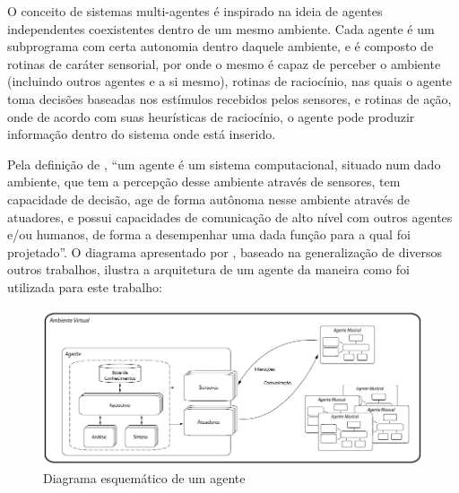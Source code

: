 \documentclass[a0,portrait]{a0poster}
\begin{document}
O conceito de sistemas multi-agentes é inspirado na ideia de agentes independentes
coexistentes dentro de um mesmo ambiente. Cada agente é um subprograma com
certa autonomia dentro daquele ambiente, e é composto de rotinas de caráter sensorial,
por onde o mesmo é capaz de perceber o ambiente (incluindo outros agentes e a si
mesmo), rotinas de raciocínio, nas quais o agente toma decisões baseadas nos estímulos
recebidos pelos sensores, e rotinas de ação, onde de acordo com suas heurísticas de
raciocínio, o agente pode produzir informação dentro do sistema onde está inserido.

Pela definição de \cite{reis-2002}, ``um agente é um sistema computacional, situado
num dado ambiente, que tem a percepção desse ambiente através de sensores, tem
capacidade de decisão, age de forma autônoma nesse ambiente através de atuadores, e
possui capacidades de comunicação de alto nível com outros agentes e/ou humanos, de
forma a desempenhar uma dada função para a qual foi projetado''. O diagrama
apresentado por \cite{Thomaz-2011}, baseado na generalização de diversos outros trabalhos,
ilustra a arquitetura de um agente da maneira como foi utilizada para este trabalho:

\begin{figure}
	\centering
	\includegraphics[width=\textwidth]{figures/agent}
	\caption{Diagrama esquemático de um agente}
	\label{fig:mas}
\end{figure}
\end{document}
